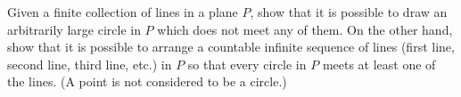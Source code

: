 Given a finite collection of lines in a plane $P$,  show that it is possible to draw an arbitrarily large circle in $P$ which does not meet any of them.  On the other hand, show that it is possible to arrange a countable infinite sequence of lines (first line, second line, third line, etc.) in $P$ so that every circle in $P$ meets at least one of the lines.  (A point is not considered to be a circle.)